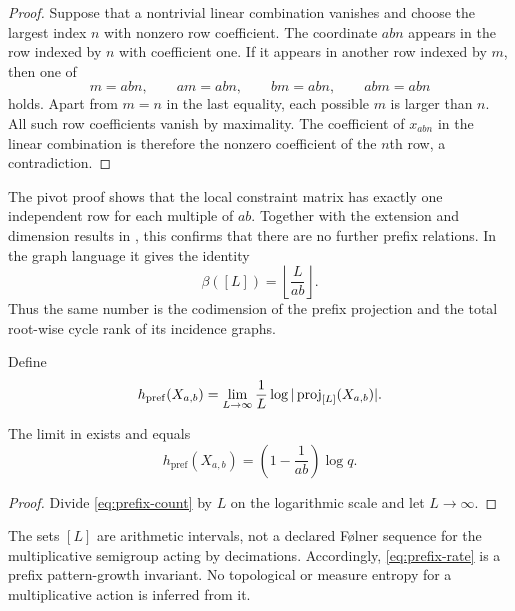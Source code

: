 \begin{proof}
Suppose that a nontrivial linear combination vanishes and choose the largest
index $n$ with nonzero row coefficient.  The coordinate $abn$ appears in the
row indexed by $n$ with coefficient one.  If it appears in another row
indexed by $m$, then one of
\[
 m=abn,\qquad am=abn,\qquad bm=abn,\qquad abm=abn
\]
holds.  Apart from $m=n$ in the last equality, each possible $m$ is larger
than $n$.  All such row coefficients vanish by maximality.  The coefficient
of $x_{abn}$ in the linear combination is therefore the nonzero coefficient
of the $n$th row, a contradiction.
\end{proof}

The pivot proof shows that the local constraint matrix has exactly one
independent row for each multiple of $ab$.  Together with the extension and
dimension results in , this confirms
that there are no further prefix relations.  In the graph language it gives
the identity
\begin{equation}\label{eq:prefix-cycle-rank}
 \beta([L])=\left\lfloor\frac{L}{ab}\right\rfloor.
\end{equation}
Thus the same number is the codimension of the prefix projection and the total
root-wise cycle rank of its incidence graphs.

\begin{definition}\label{def:prefix-complexity}
Define
\[
 h_{\mathrm{pref}}(X_{a,b})
 =\lim_{L\to\infty}\frac1L
 \log|\operatorname{proj}_{[L]}(X_{a,b})|.
\]
\end{definition}

\begin{corollary}\label{cor:prefix-rate}
The limit in  exists and equals
\begin{equation}\label{eq:prefix-rate}
 h_{\mathrm{pref}}(X_{a,b})
 =\left(1-\frac1{ab}\right)\log q.
\end{equation}
\end{corollary}

\begin{proof}
Divide \eqref{eq:prefix-count} by $L$ on the logarithmic scale and let
$L\to\infty$.
\end{proof}

\begin{remark}\label{rem:prefix-not-entropy}
The sets $[L]$ are arithmetic intervals, not a declared F\o lner sequence for
the multiplicative semigroup acting by decimations.  Accordingly,
\eqref{eq:prefix-rate} is a prefix pattern-growth invariant.  No topological
or measure entropy for a multiplicative action is inferred from it.
\end{remark}

